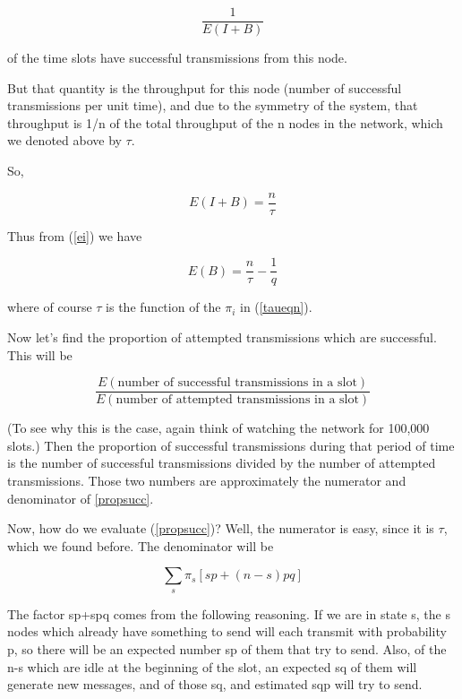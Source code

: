 \begin{equation}
\frac{1}{E(I+B)}  
\end{equation}

of the time slots have successful
transmissions from this node. 

But that quantity is the throughput for this node (number of successful
transmissions per unit time), and due to the symmetry of the system,
that throughput is 1/n of the total throughput of the n nodes in the
network, which we denoted above by $\tau$.

So, 

\begin{equation}
E(I+B)=\frac{n}{\tau}
\end{equation}

Thus from (\ref{ei}) we have

\begin{equation}
E(B)=\frac{n}{\tau }-\frac{1}{q}
\end{equation}  

where of course $\tau$ is the function of the $\pi_{i}$ in
(\ref{taueqn}).

Now let's find the proportion of attempted transmissions which are
successful.  This will be

\begin{equation}
\label{propsucc}
\frac{E(\textrm{number of successful transmissions in a slot})}
{E(\textrm{number of attempted transmissions in a slot})}
\end{equation}

(To see why this is the case, again think of watching the network for
100,000 slots.)  Then the proportion of successful transmissions during
that period of time is the number of successful transmissions divided by
the number of attempted transmissions.  Those two numbers are
approximately the numerator and denominator of \ref{propsucc}.

Now, how do we evaluate (\ref{propsucc})?  Well, the numerator is easy,
since it is $\tau$, which we found before.  The denominator will be

\begin{equation}
\sum_s \pi_s [sp + (n-s)pq]
\end{equation}

The factor sp+spq comes from the following reasoning.  If we are in
state s, the s nodes which already have something to send will each
transmit with probability p, so there will be an expected number sp of
them that try to send.  Also, of the n-s which are idle at the beginning
of the slot, an expected sq of them will generate new messages, and of
those sq, and estimated sqp will try to send.

